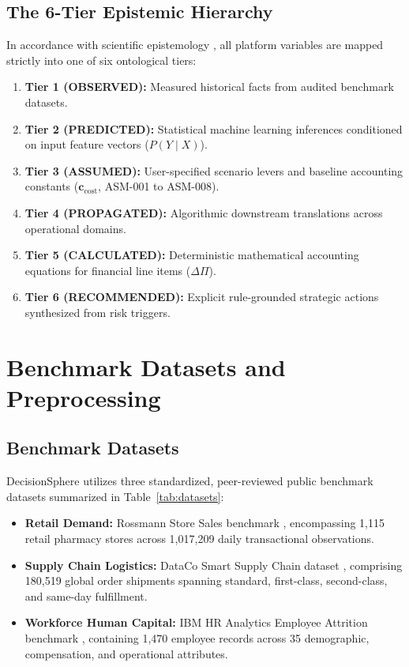 \documentclass[conference]{IEEEtran}
\begin{document}
\subsection{The 6-Tier Epistemic Hierarchy}
In accordance with scientific epistemology \cite{shmueli2010explain}, all platform variables are mapped strictly into one of six ontological tiers:
\begin{enumerate}
    \item \textbf{Tier 1 (OBSERVED):} Measured historical facts from audited benchmark datasets.
    \item \textbf{Tier 2 (PREDICTED):} Statistical machine learning inferences conditioned on input feature vectors ($P(Y \mid X)$).
    \item \textbf{Tier 3 (ASSUMED):} User-specified scenario levers and baseline accounting constants ($\mathbf{c}_{\text{cost}}$, ASM-001 to ASM-008).
    \item \textbf{Tier 4 (PROPAGATED):} Algorithmic downstream translations across operational domains.
    \item \textbf{Tier 5 (CALCULATED):} Deterministic mathematical accounting equations for financial line items ($\Delta \Pi$).
    \item \textbf{Tier 6 (RECOMMENDED):} Explicit rule-grounded strategic actions synthesized from risk triggers.
\end{enumerate}

\section{Benchmark Datasets and Preprocessing}

\subsection{Benchmark Datasets}
DecisionSphere utilizes three standardized, peer-reviewed public benchmark datasets summarized in Table~\ref{tab:datasets}:
\begin{itemize}
    \item \textbf{Retail Demand:} Rossmann Store Sales benchmark \cite{rossmann2015kaggle}, encompassing 1,115 retail pharmacy stores across 1,017,209 daily transactional observations.
    \item \textbf{Supply Chain Logistics:} DataCo Smart Supply Chain dataset \cite{constante2019dataco}, comprising 180,519 global order shipments spanning standard, first-class, second-class, and same-day fulfillment.
    \item \textbf{Workforce Human Capital:} IBM HR Analytics Employee Attrition benchmark \cite{ibm2017attrition}, containing 1,470 employee records across 35 demographic, compensation, and operational attributes.
\end{itemize}
\end{document}
